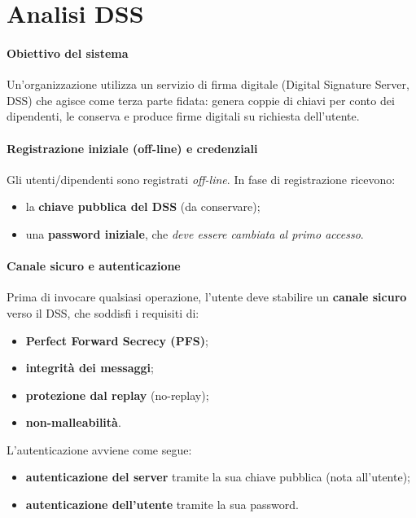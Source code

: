 \section{Analisi DSS}

\paragraph{Obiettivo del sistema}
Un'organizzazione utilizza un servizio di firma digitale (Digital Signature Server, DSS) che agisce
come terza parte fidata: genera coppie di chiavi per conto dei dipendenti, le conserva e produce
firme digitali su richiesta dell'utente. %

\paragraph{Registrazione iniziale (off-line) e credenziali}
Gli utenti/dipendenti sono registrati \emph{off-line}. In fase di registrazione ricevono:
\begin{itemize}
  \item la \textbf{chiave pubblica del DSS} (da conservare);
  \item una \textbf{password iniziale}, che \emph{deve essere cambiata al primo accesso}.
\end{itemize}

\paragraph{Canale sicuro e autenticazione}
Prima di invocare qualsiasi operazione, l'utente deve stabilire un \textbf{canale sicuro} verso il DSS,
che soddisfi i requisiti di:
\begin{itemize}
  \item \textbf{Perfect Forward Secrecy (PFS)};
  \item \textbf{integrità dei messaggi};
  \item \textbf{protezione dal replay} (no-replay);
  \item \textbf{non-malleabilità}.
\end{itemize}
L'autenticazione avviene come segue:
\begin{itemize}
  \item \textbf{autenticazione del server} tramite la sua chiave pubblica (nota all'utente);
  \item \textbf{autenticazione dell'utente} tramite la sua password.
\end{itemize}


